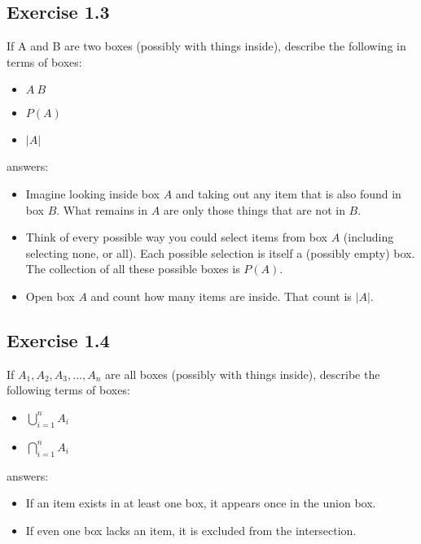 \documentclass[12pt]{article}
\begin{document}
		\subsection*{Exercise 1.3}
			If A and B are two boxes (possibly with things inside), describe the following in terms of boxes:
			\begin{itemize}
				\item $A \ B$
				\item $P(A)$
				\item $|A|$
			\end{itemize}
			answers:
			\begin{itemize}
				\item Imagine looking inside box $A$ and taking out any item that is also found in box $B$. What remains in $A$ are only those things that are not in $B$.
				\item Think of every possible way you could select items from box $A$ (including selecting none, or all). Each possible selection is itself a (possibly empty) box. The collection of all these possible boxes is $P(A)$.
				\item Open box $A$ and count how many items are inside. That count is $|A|$.
			\end{itemize}
		\subsection*{Exercise 1.4}
			If $A_1, A_2, A_3, ..., A_n$ are all boxes (possibly with things inside), describe the following terms of boxes:
			\begin{itemize}
				\item $\bigcup_{i=1}^{n}A_i$
				\item $\bigcap_{i=1}^{n}A_i$
			\end{itemize}
			answers:
			\begin{itemize}
				\item If an item exists in at least one box, it appears once in the union box.
				\item If even one box lacks an item, it is excluded from the intersection.
			\end{itemize}
\end{document}
